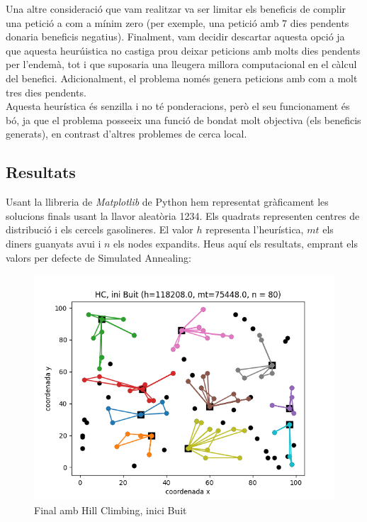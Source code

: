 \documentclass[a4paper]{article}
\begin{document}
Una altre consideració que vam realitzar va ser limitar els beneficis de complir una petició a com a mínim zero (per exemple, una petició amb 7 dies pendents donaria beneficis negatius). Finalment, vam decidir descartar aquesta opció ja que aquesta heurúistica no castiga prou deixar peticions amb molts dies pendents per l'endemà, tot i que suposaria una lleugera millora computacional en el càlcul del benefici. Adicionalment, el problema només genera peticions amb com a molt tres dies pendents.\\

Aquesta heurística és senzilla i no té ponderacions, però el seu funcionament és bó, ja que el problema posseeix una funció de bondat molt objectiva (els beneficis generats), en contrast d'altres problemes de cerca local.\\

\newpage
\subsection{Resultats}
Usant la llibreria de \emph{Matplotlib} de Python hem representat gràficament les solucions finals usant la llavor aleatòria 1234. Els quadrats representen centres de distribució i els cercels gasolineres. El valor $h$ representa l'heurística, $mt$ els diners guanyats avui i $n$ els nodes expandits. Heus aquí els resultats, emprant els valors per defecte de Simulated Annealing:

\begin{figure}[htp]
\centering
\includegraphics[scale=0.65]{images/fig6.png}
\caption{Final amb Hill Climbing, inici Buit}
\centering
\end{figure}
\end{document}
